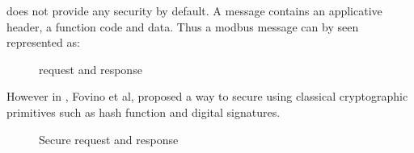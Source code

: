 \modbus does not provide any security by default.
A message contains an applicative header, a function code and data.
Thus a modbus message can by seen represented as:

\begin{figure}[htb]
    \centering
    \renewcommand{\smname}{\smn}
    \caption{\modbus request and response}
    \label{fig:modbus_none}
\end{figure}

However in \cite{FCMT09}, Fovino et al, proposed a way to secure \modbus using
classical cryptographic primitives such as hash function and digital signatures.

\begin{figure}[htb]
    \centering
    \renewcommand{\smname}{\sms}
    \caption{Secure \modbus request and response}
    \label{fig:modbus_fix}
\end{figure}


